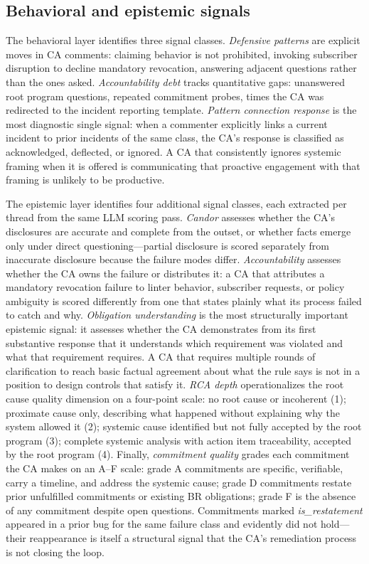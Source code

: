 \documentclass[10pt,twocolumn,letterpaper]{article}
\begin{document}
\subsection{Behavioral and epistemic signals}

The behavioral layer identifies three signal classes. \textit{Defensive patterns} are
explicit moves in CA comments: claiming behavior is not prohibited, invoking subscriber
disruption to decline mandatory revocation, answering adjacent questions rather than the
ones asked. \textit{Accountability debt} tracks quantitative gaps: unanswered root program
questions, repeated commitment probes, times the CA was redirected to the incident
reporting template. \textit{Pattern connection response} is the most diagnostic single
signal: when a commenter explicitly links a current incident to prior incidents of the
same class, the CA's response is classified as acknowledged, deflected, or ignored. A CA
that consistently ignores systemic framing when it is offered is communicating that
proactive engagement with that framing is unlikely to be productive.

The epistemic layer identifies four additional signal classes, each extracted per thread
from the same LLM scoring pass. \textit{Candor} assesses whether the CA's disclosures
are accurate and complete from the outset, or whether facts emerge only under direct
questioning---partial disclosure is scored separately from inaccurate disclosure because
the failure modes differ. \textit{Accountability} assesses whether the CA owns the
failure or distributes it: a CA that attributes a mandatory revocation failure to linter
behavior, subscriber requests, or policy ambiguity is scored differently from one that
states plainly what its process failed to catch and why. \textit{Obligation understanding}
is the most structurally important epistemic signal: it assesses whether the CA
demonstrates from its first substantive response that it understands which requirement was
violated and what that requirement requires. A CA that requires multiple rounds of
clarification to reach basic factual agreement about what the rule says is not in a
position to design controls that satisfy it. \textit{RCA depth} operationalizes the root
cause quality dimension on a four-point scale: no root cause or incoherent
(1); proximate cause only, describing what happened without explaining why the system
allowed it (2); systemic cause identified but not fully accepted by the root program (3);
complete systemic analysis with action item traceability, accepted by the root
program (4). Finally, \textit{commitment quality} grades each commitment the CA makes on
an A--F scale: grade A commitments are specific, verifiable, carry a timeline, and
address the systemic cause; grade D commitments restate prior unfulfilled commitments or
existing BR obligations; grade F is the absence of any commitment despite open questions.
Commitments marked \textit{is\_restatement} appeared in a prior bug for the same
failure class and evidently did not hold---their reappearance is itself a structural
signal that the CA's remediation process is not closing the loop.
\end{document}
